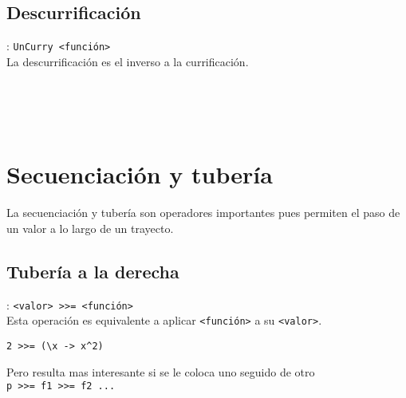       \begin{fxcode}
         \\
         \\
         \\
      \end{fxcode}
      
      \subsection*{Descurrificación}: \texttt{UnCurry <función>}\\
      La descurrificación es el inverso a la currificación.
      
      \begin{fxcode}
         \\
         \\
         \\
      \end{fxcode}
      
   \section{Secuenciación y tubería}
      La secuenciación y tubería son operadores importantes pues permiten el paso de un valor a lo largo de un trayecto.
      \\
      
      \subsection*{Tubería a la derecha}: \texttt{<valor>~\texttt{>}\texttt{>}=~<función>}\\
      Esta operación es equivalente a aplicar \texttt{<función>} a su \texttt{<valor>}.
      
      \begin{fxcode}
         \texttt{2~\texttt{>}\texttt{>}=~(\textbackslash x ->~x\^{}2)}\\
      \end{fxcode}
      
      Pero resulta mas interesante si se le coloca uno seguido de otro
      \\
      
      \texttt{p~\texttt{>}\texttt{>}=~f1~\texttt{>}\texttt{>}=~f2 ...}
      \\
      
